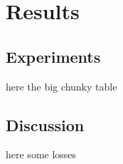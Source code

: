 \documentclass[a4paper,10pt]{article}
\title{}
\author{Jose Rodriguez}
\begin{document}
\maketitle

\begin{abstract}

\end{abstract}

\section{Results}
\subsection{Experiments}
here the big chunky table
\subsection{Discussion}
here some losses
\end{document}
